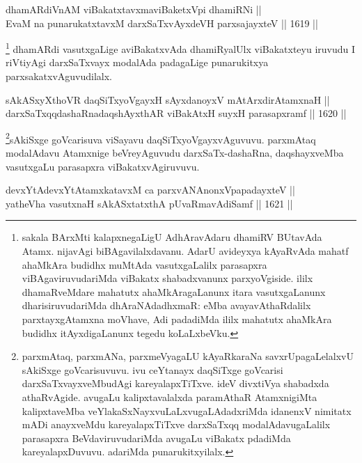 
\begin{shl}
dhamARdiVnAM viBakatxtavxmaviBaketxV\s pi dhamiRNi || \\
EvaM na punarukatxtavxM darxSaTxvAyxdeVH parxsajayxteV ||  1619 ||  
\end{shl}

\begin{artha}
\footnote{sakala BArxMti kalapxnegaLigU AdhAravAdaru dhamiRV BUtavAda Atamx. nijavAgi biBAgavilalxdavanu. AdarU avideyxya kAyaRvAda mahatf ahaMkAra budidhx muMtAda vasutxgaLalilx parasapxra viBAgaviruvudariMda viBakatx shabadxvanunx parxyoVgiside. ililx dhamaRveMdare mahatutx ahaMkAragaLanunx itara vasutxgaLanunx dharisiruvudariMda dhAraNAdadhxmaR: eMba avayavAthaRdalilx parxtayxgAtamxna moVhave, Adi padadiMda ililx mahatutx ahaMkAra budidhx itAyxdigaLanunx tegedu koLaLxbeVku.}
dhamARdi vasutxgaLige aviBakatxvAda dhamiRyalUlx viBakatxteyu iruvudu I riVtiyAgi darxSaTxvayx modalAda padagaLige punarukitxya parxsakatxvAguvudilalx.
\end{artha}


\begin{shl}
sAkASxyXthoVR daqSiTxyoVgayxH sAyxdanoyxV mAtArxdirAtamxnaH || \\
darxSaTxqqdashaRnadaqshAyxthAR viBakAtxH suyxH parasapxramf ||  1620 ||  
\end{shl}

\begin{artha}
\footnote{parxmAtaq, parxmANa, parxmeVyagaLU kAyaRkaraNa savxrUpagaLelalxvU sAkiSxge goVcarisuvuvu. ivu ceYtanayx daqSiTxge goVcarisi darxSaTxvayxveMbudAgi kareyalapxTiTxve. ideV divxtiVya shabadxda athaRvAgide. avugaLu kalipxtavalalxda paramAthaR AtamxnigiMta kalipxtaveMba veYlakaSxNayxvuLaLxvugaLAdadxriMda idanenxV nimitatx mADi anayxveMdu kareyalapxTiTxve darxSaTxqq modalAdavugaLalilx parasapxra BeVdaviruvudariMda avugaLu viBakatx pdadiMda kareyalapxDuvuvu. adariMda punarukitxyilalx.}sAkiSxge goVcarisuva viSayavu daqSiTxyoVgayxvAguvuvu. parxmAtaq modalAdavu Atamxnige beVreyAguvudu darxSaTx-dashaRna, daqshayxveMba vasutxgaLu parasapxra viBakatxvAgiruvuvu.
\end{artha}


\begin{shl}
devxYtAdevxYtAtamxkatavxM ca parxvANAnonxVpapadayxteV || \\
yatheVha vasutxnaH sAkASxtatxthA pUvaRmavAdiSamf ||  1621 ||  
\end{shl}

